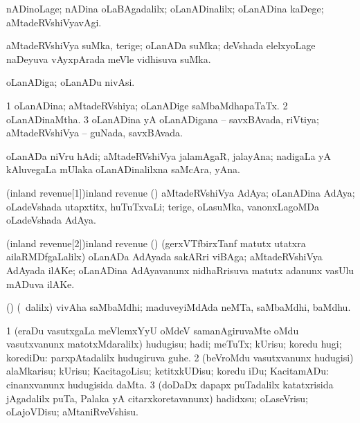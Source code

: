 \bentry
{}
\gl{\kirxvi}
\bmng
nADinoLage; nADina oLaBAgadalilx; oLanADinalilx; oLanADina kaDege; aMtadeRVshiVyavAgi. 
\emng
\eentry

\bentry
{}
\gl{\nA}
\bmng
aMtadeRVshiVya suMka, terige; oLanADa suMka; deVshada elelxyoLage naDeyuva vAyxpArada meVle vidhisuva suMka. 
\emng
\eentry

\bentry
{}
\gl{\nA}
\bmng
oLanADiga; oLanADu nivAsi. 
\emng
\eentry

\bentry
{}
\gl{\gu}
\bmng
\bnum
\num{1} oLanADina; aMtadeRVshiya; oLanADige saMbaMdhapaTaTx. 
\num{2} oLanADinaMtha. 
\num{3} oLanADina yA oLanADigana -- savxBAvada, riVtiya; aMtadeRVshiVya -- guNada, savxBAvada. 
\enum
\emng
\eentry

\bentry
{}
\gl{\nA}
\bmng
oLanADa niVru hAdi; aMtadeRVshiVya jalamAgaR, jalayAna; nadigaLa yA kAluvegaLa mUlaka oLanADinalilxna saMcAra, yAna. 
\emng
\eentry

\bentry
\word(inland revenue[1]){inland revenue}
\gl{\nA}
\bmng
(\birx) aMtadeRVshiVya AdAya; oLanADina AdAya; oLadeVshada utapxtitx, huTuTxvaLi; terige, oLasuMka, \mo vanonxLagoMDa oLadeVshada AdAya. 
\emng
\eentry

\bentry
\word(inland revenue[2]){inland revenue}
\gl{\nA}
\bmng
(\birx) (gerxVTfbirxTanf matutx utatxra ailaRMDfgaLalilx) oLanADa AdAyada sakARri viBAga; aMtadeRVshiVya AdAyada ilAKe; oLanADina AdAyavanunx nidhaRrisuva matutx adanunx vasUlu mADuva ilAKe. 
\emng
\eentry

\bentry
{}
\gl{\nA}
\bmng
(\AmA) (\sA\ \bava dalilx) vivAha saMbaMdhi; maduveyiMdAda neMTa, saMbaMdhi, baMdhu. 
\emng
\eentry

\bentry
{}
\gl{\sakirx}
\bmng
\bnum
\num{1} (eraDu vasutxgaLa meVlemxYyU oMdeV samanAgiruvaMte oMdu vasutxvanunx matotxMdaralilx) hudugisu; hadi; meTuTx; kUrisu; koredu hugi; korediDu:  parxpAtadalilx hudugiruva guhe. 
\num{2} (beVroMdu vasutxvanunx hudugisi) alaMkarisu; kUrisu; KacitagoLisu; ketitxkUDisu; koredu iDu; KacitamADu:  cinanxvanunx hudugisida daMta. 
\num{3} (doDaDx dapapx puTadalilx katatxrisida jAgadalilx puTa, Palaka yA citarxkoretavanunx) hadidxsu; oLaseVrisu; oLajoVDisu; aMtaniRveVshisu. 
\enum
\emng
\eentry

